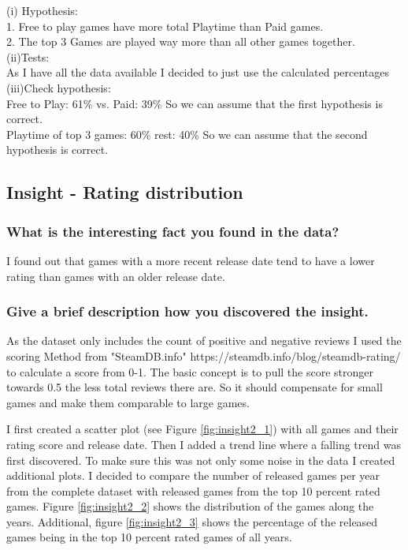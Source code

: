 \documentclass[11pt]{article}
\begin{document}
(i) Hypothesis:\\
1. Free to play games have more total Playtime than Paid games.\\
2. The top 3 Games are played way more than all other games together.\\
(ii)Tests:\\
As I have all the data available I decided to just use the calculated percentages\\
(iii)Check hypothesis:\\
Free to Play: 61\% vs. Paid: 39\% So we can assume that the first hypothesis is correct.\\
Playtime of top 3 games:  60\% rest: 40\% So we can assume that the second hypothesis is correct.\\

\subsection{Insight - Rating distribution}

\subsubsection{What is the interesting fact you found in the data?}

I found out that games with a more recent release date tend to have a lower rating than games with an older release date.\\

\subsubsection{Give a brief description how you discovered the
insight.}

As the dataset only includes the count of positive and negative reviews I used the scoring Method from "SteamDB.info" https://steamdb.info/blog/steamdb-rating/ to calculate a score from 0-1. The basic concept is to pull the score stronger towards 0.5 the less total reviews there are. So it should compensate for small  games and make them comparable to large games. 

I first created a scatter plot (see Figure \ref{fig:insight2_1}) with all games and their rating score and release date. Then I added a trend line where a falling trend was first discovered. To make sure this was not only some noise in the data I created additional plots. I decided to compare the number of released games per year from the complete dataset with released games from the top 10 percent rated games. Figure \ref{fig:insight2_2} shows the distribution of the games along the years. Additional, figure \ref{fig:insight2_3} shows the percentage of the released games being in the top 10 percent rated games of all years.  
\end{document}
